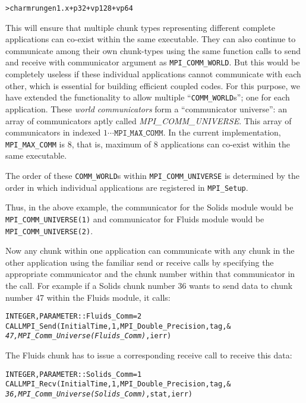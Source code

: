 \documentclass[10pt]{article}
\begin{document}
\begin{alltt}
> charmrun gen1.x +p 32 +vp 128 +vp 64
\end{alltt}

This will ensure that multiple chunk types representing different complete
applications can co-exist within the same executable. They can also continue to
communicate among their own chunk-types using the same \ampi{} function calls
to send and receive with communicator argument as \texttt{MPI\_COMM\_WORLD}.
But this would be completely useless if these individual applications cannot
communicate with each other, which is essential for building efficient coupled
codes.  For this purpose, we have extended the \ampi{} functionality to allow
multiple ``\texttt{COMM\_WORLD}s''; one for each application. These \emph{world
communicators} form a ``communicator universe'': an array of communicators
aptly called \emph{MPI\_COMM\_UNIVERSE}. This array of communicators in
indexed $1\cdots\texttt{MPI\_MAX\_COMM}$. In the current implementation,
\texttt{MPI\_MAX\_COMM} is 8, that is, maximum of 8 applications can co-exist
within the same executable.

The order of these \texttt{COMM\_WORLD}s within \texttt{MPI\_COMM\_UNIVERSE}
is determined by the order in which individual applications are registered in
\texttt{MPI\_Setup}.

Thus, in the above example, the communicator for the Solids module would be
\texttt{MPI\_COMM\_UNIVERSE(1)} and communicator for Fluids module would be
\texttt{MPI\_COMM\_UNIVERSE(2)}.

Now any chunk within one application can communicate with any chunk in the
other application using the familiar send or receive \ampi{} calls by
specifying the appropriate communicator and the chunk number within that
communicator in the call. For example if a Solids chunk number 36 wants to send
data to chunk number 47 within the Fluids module, it calls:

\begin{alltt}
INTEGER , PARAMETER :: Fluids_Comm = 2
CALL MPI_Send(InitialTime, 1, MPI_Double_Precision, tag, &
        \emph{47, MPI_Comm_Universe(Fluids_Comm)}, ierr)
\end{alltt}

The Fluids chunk has to issue a corresponding receive call to receive this
data:

\begin{alltt}
INTEGER , PARAMETER :: Solids_Comm = 1
CALL MPI_Recv(InitialTime, 1, MPI_Double_Precision, tag, &
        \emph{36, MPI_Comm_Universe(Solids_Comm)}, stat, ierr)
\end{alltt}
\end{document}

